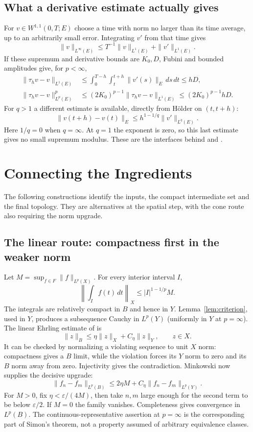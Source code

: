 \documentclass[12pt,reqno]{amsart}
\begin{document}
\subsection{What a derivative estimate actually gives}
For $v\in W^{1,1}(0,T;E)$ choose a time with norm no larger than its time average, up to an arbitrarily small error. Integrating $v'$ from that time gives
\begin{equation}\label{eq:w11}
\|v\|_{L^\infty(E)}\le T^{-1}\|v\|_{L^1(E)}+\|v'\|_{L^1(E)}.
\end{equation}
If these supremum and derivative bounds are $K_0,D$, Fubini and bounded amplitudes give, for $p<\infty$,
\begin{align}
\|\tau_hv-v\|_{L^1(E)}
&\le\int_0^{T-h}\int_t^{t+h}\|v'(s)\|_E\,ds\,dt\le hD,\label{eq:l1shift}\\
\|\tau_hv-v\|_{L^p(E)}^p
&\le(2K_0)^{p-1}\|\tau_hv-v\|_{L^1(E)}
\le(2K_0)^{p-1}hD.\label{eq:pshift}
\end{align}
For $q>1$ a different estimate is available, directly from H\"older on $(t,t+h)$:
\begin{equation}\label{eq:supshift}
\|v(t+h)-v(t)\|_E\le h^{1-1/q}\|v'\|_{L^q(E)}.
\end{equation}
Here $1/q=0$ when $q=\infty$. At $q=1$ the exponent is zero, so this last estimate gives no small supremum modulus. These are the interfaces behind \cite[Lemma 4, pp.~77--78]{S-simon} and \cite[Corollary 2.4, p.~1730]{S-maitre}.
\section{Connecting the Ingredients}
The following constructions identify the inputs, the compact intermediate set and the final topology. They are alternatives at the spatial step, with the cone route also requiring the norm upgrade.
\subsection{The linear route: compactness first in the weaker norm}
Let $M=\sup_{f\in F}\|f\|_{L^p(X)}$. For every interior interval $I$,
\[
\left\|\int_I f(t)\,dt\right\|_X\le |I|^{1-1/p}M.
\]
The integrals are relatively compact in $B$ and hence in $Y$. Lemma~\ref{lem:criterion}, used in $Y$, produces a subsequence Cauchy in $L^p(Y)$ (uniformly in $Y$ at $p=\infty$).
The linear Ehrling estimate of \cite[Lemma 8, pp.~84--85]{S-simon} is
\[
\|z\|_B\le\eta\|z\|_X+C_\eta\|z\|_Y,\qquad z\in X.
\]
It can be checked by normalizing a violating sequence to unit $X$ norm: compactness gives a $B$ limit, while the violation forces its $Y$ norm to zero and its $B$ norm away from zero. Injectivity gives the contradiction.
Minkowski now supplies the decisive upgrade:
\begin{equation}\label{eq:linearupgrade}
\|f_n-f_m\|_{L^p(B)}\le 2\eta M+C_\eta\|f_n-f_m\|_{L^p(Y)}.
\end{equation}
For $M>0$, fix $\eta<\varepsilon/(4M)$, then take $n,m$ large enough for the second term to be below $\varepsilon/2$. If $M=0$ the family vanishes. Completeness gives convergence in $L^p(B)$. The continuous-representative assertion at $p=\infty$ is the corresponding part of Simon's theorem, not a property assumed of arbitrary equivalence classes.
\end{document}
